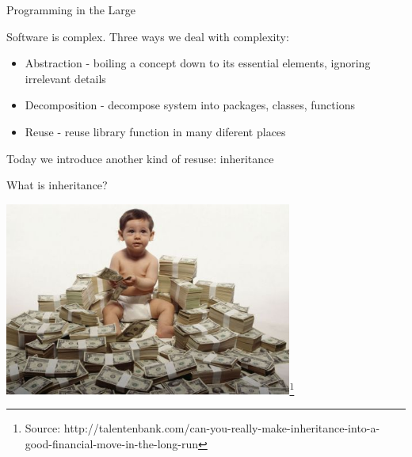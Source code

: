 \documentclass{beamer}
\author[Chris Simpkins] 
{Christopher Simpkins \\\texttt{chris.simpkins@gatech.edu}}
\institute[Georgia Tech] %
\date{}
\begin{document}
\begin{frame}
  \titlepage
\end{frame}

\begin{frame}[fragile]{Programming in the Large}


Software is complex.  Three ways we deal with complexity:
\begin{itemize}
\item Abstraction - boiling a concept down to its essential elements, ignoring irrelevant details
\item Decomposition - decompose system into packages, classes, functions
\item Reuse - reuse library function in many diferent places
\end{itemize}
\vspace{.1in}
Today we introduce another kind of resuse: inheritance

\end{frame}

\begin{frame}[fragile]{What is inheritance?}

\begin{center}
\includegraphics[height=2.5in]{money_Inheritance.jpg}\footnote{Source: http://talentenbank.com/can-you-really-make-inheritance-into-a-good-financial-move-in-the-long-run}
\end{center}

\end{frame}
\end{document}
